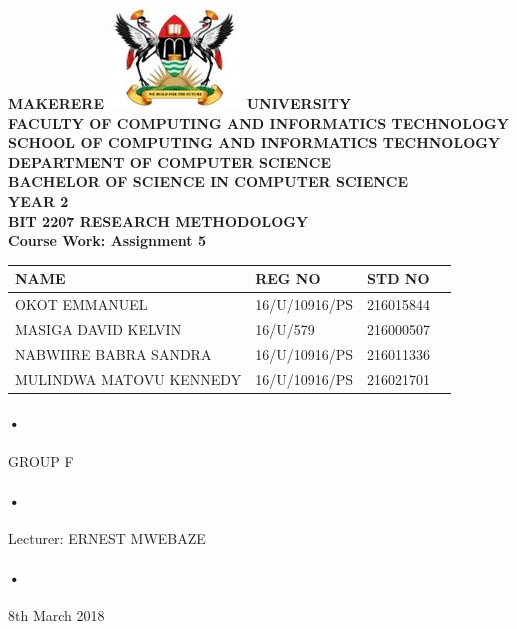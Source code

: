 \documentclass[12pt]{report}
\begin{document}
\begin{Huge}
\begin{center}
\begin{normalsize}
\textbf{MAKERERE \includegraphics[scale=0.5]{logo} UNIVERSITY }\\


\textbf{FACULTY OF COMPUTING AND INFORMATICS TECHNOLOGY} \\
\textbf{SCHOOL OF COMPUTING AND INFORMATICS TECHNOLOGY} \\
\textbf{DEPARTMENT OF COMPUTER SCIENCE} \\
\textbf{BACHELOR OF SCIENCE IN COMPUTER SCIENCE} \\
\textbf{YEAR 2} \\
\textbf{BIT 2207 RESEARCH METHODOLOGY} \\
\textbf{Course Work: Assignment 5}\\
\end{normalsize}
\end{center}
\end{Huge}

\begin{center}
\begin{tabular}{|l|l|l|c|}
\hline NAME  & REG NO & STD NO \\\hline
OKOT EMMANUEL& 16/U/10916/PS & 216015844 \\\hline
MASIGA DAVID KELVIN& 16/U/579 & 216000507 \\\hline
NABWIIRE BABRA SANDRA& 16/U/10916/PS & 216011336 \\\hline
MULINDWA MATOVU KENNEDY& 16/U/10916/PS & 216021701 \\\hline
\end{tabular}
\paragraph{•}
GROUP F\\
\paragraph{•}
Lecturer: ERNEST MWEBAZE \\
\paragraph{•}
8th March 2018

\end{center}
\end{document}

